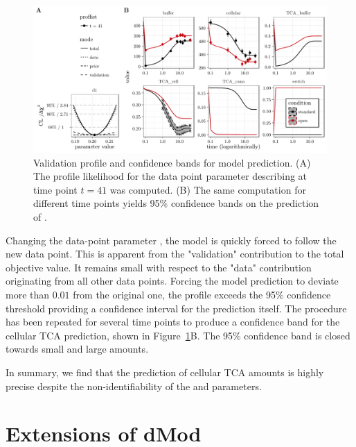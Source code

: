 \documentclass[article]{jss}
\begin{document}
\begin{figure}[ht]
	\centering
	\includegraphics[width = \textwidth]{images/figure9}
	\caption{Validation profile and confidence bands for model prediction. (A) The profile likelihood for the data point parameter  describing  at time point $t = 41$ was computed. (B) The same computation for different time points yields 95\% confidence bands on the prediction of .}
	\label{fig:validation}
\end{figure}

Changing the data-point parameter , the model is quickly forced to follow the new data point. This is apparent from the "validation" contribution to the total objective value. It remains small with respect to the "data" contribution originating from all other data points. Forcing the model prediction to deviate more than $0.01$ from the original one, the profile exceeds the 95\% confidence threshold providing a confidence interval for the prediction itself. The procedure has been repeated for several time points to produce a confidence band for the cellular TCA prediction, shown in Figure~\ref{fig:validation}B. The 95\% confidence band is closed towards small and large amounts. 

In summary, we find that the prediction of cellular TCA amounts is highly precise despite the non-identifiability of the  and  parameters.

\section{Extensions of dMod}
\label{sec:extensions}

{}
\end{document}
